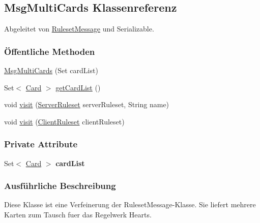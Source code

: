 \hypertarget{a00046}{\subsection{Msg\-Multi\-Cards Klassenreferenz}
\label{a00046}
}


Abgeleitet von \hyperlink{a00053}{Ruleset\-Message} und Serializable.

\subsubsection*{Öffentliche Methoden}
\begin{DoxyCompactItemize}
\item 
\hyperlink{a00046_a4bb40ccd570d979fcef33ffafb5c23a9}{Msg\-Multi\-Cards} (Set card\-List)
\item 
Set$<$ \hyperlink{a00054}{Card} $>$ \hyperlink{a00046_a84a6c04ecb3d13ea4a456862ac72cdf6}{get\-Card\-List} ()
\item 
void \hyperlink{a00046_ab45288da8f64e79408f1effd5579b5c2}{visit} (\hyperlink{a00068}{Server\-Ruleset} server\-Ruleset, String name)
\item 
void \hyperlink{a00046_acb5be722a2d1c9110d39f31c6e18f6e7}{visit} (\hyperlink{a00056}{Client\-Ruleset} client\-Ruleset)
\end{DoxyCompactItemize}
\subsubsection*{Private Attribute}
\begin{DoxyCompactItemize}
\item 
\hypertarget{a00046_a2994bb7f93a3ba7462f42533b4625649}{Set$<$ \hyperlink{a00054}{Card} $>$ {\bfseries card\-List}}\label{a00046_a2994bb7f93a3ba7462f42533b4625649}

\end{DoxyCompactItemize}


\subsubsection{Ausführliche Beschreibung}
Diese Klasse ist eine Verfeinerung der Ruleset\-Message-\/\-Klasse. Sie liefert mehrere Karten zum Tausch fuer das Regelwerk Hearts. 

